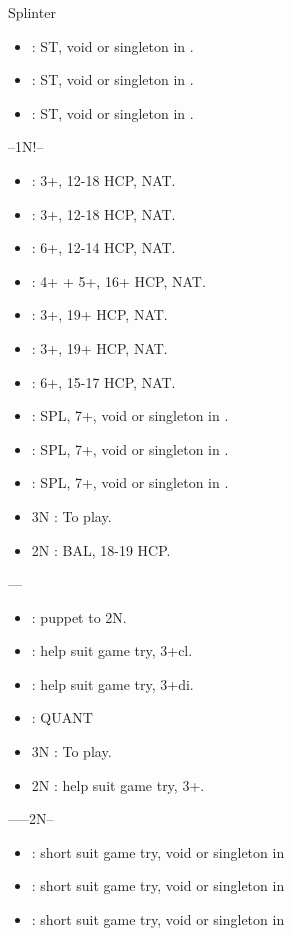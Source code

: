 \documentclass[12pt,twoside,a5paper]{report}%
\begin{document}
	Splinter
	\begin{itemize}
	\renewcommand{\labelitemi}{}
	\item {}: ST, void or singleton in \cl{}.
	\item {}: ST, void or singleton in \di{}.
	\item {}: ST, void or singleton in \sp{}.
	\end{itemize}

	--1N!--
	\begin{itemize}
	\renewcommand{\labelitemi}{}
	\item {} : 3+\cl{}, 12-18 HCP, NAT.
	\item {} : 3+\di{}, 12-18 HCP, NAT.
	\item {} : 6+\he{}, 12-14 HCP, NAT.
	\item {} : 4+\sp{} + 5+\he{}, 16+ HCP, NAT.
	\item {} : 3+\cl{}, 19+ HCP, NAT.
	\item {} : 3+\di{}, 19+ HCP, NAT.
	\item {} : 6+\he{}, 15-17 HCP, NAT.
	\item {} : SPL, 7+\he{}, void or singleton in \sp{}. 
	\item {} : SPL, 7+\he{}, void or singleton in \cl{}.
	\item {} : SPL, 7+\he{}, void or singleton in \di{}.
	\item 3N : To play.
	\item 2N : BAL, 18-19 HCP.
	\end{itemize}

	----
	\begin{itemize}
	\renewcommand{\labelitemi}{}
	\item {} : puppet to 2N.
	\item {} : help suit game try, 3+cl{}.
	\item {} : help suit game try, 3+di{}.
	\item {} : QUANT
	\item 3N : To play.
	\item 2N : help suit game try, 3+\sp{}. 
	\end{itemize}

	------2N--
	\begin{itemize}
	\renewcommand{\labelitemi}{}
	\item {} : short suit game try, void or singleton in \cl{}
	\item {} : short suit game try, void or singleton in \di{}
	\item {} : short suit game try, void or singleton in \sp{}
	\end{itemize}
\end{document}
